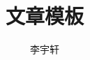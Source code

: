 \documentclass{article-argon}
\title{文章模板}
\author{李宇轩}
\begin{document}
\maketitle

\tableofcontents

\nocite{*}




\end{document}
